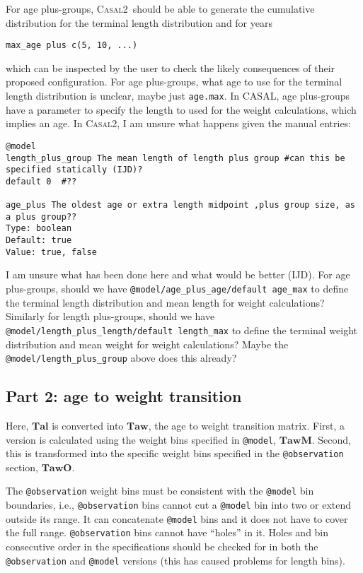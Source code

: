 \documentclass[a4paper,11pt,twoside,pdftex,draft]{article}
\newcommand{\CNAME}{\textsc{Casal2}}
\begin{document}
For age plus-groups, \CNAME\  should be able to generate the cumulative distribution for the terminal length distribution and for years \begin{verbatim} 
max_age plus c(5, 10, ...)
\end{verbatim}
 which can be inspected by the user to check the likely consequences of their proposed configuration. For age plus-groups, what age to use for the terminal length distribution is unclear, maybe just \texttt{age.max}. 
In CASAL, age plus-groups have a parameter to specify the length to used for the weight calculations, which implies an age. In \CNAME, I am unsure what happens given the manual entries:

\begin{verbatim}
@model
length_plus_group The mean length of length plus group #can this be specified statically (IJD)?
default 0  #??

age_plus The oldest age or extra length midpoint ,plus group size, as a plus group??
Type: boolean
Default: true
Value: true, false
\end{verbatim}

I am unsure what has been done here and what would be better (IJD).
For age plus-groups, should we have \texttt{@model/age\_plus\_age/default age\_max} to define the terminal length distribution and mean length for weight calculations?
Similarly for length plus-groups, should we have \texttt{@model/length\_plus\_length/default length\_max} to define the terminal weight distribution and mean weight for weight calculations? Maybe the \texttt{@model/length\_plus\_group} above does this already?

\subsection{Part 2: age to weight transition}
Here, $\mathbf{Tal}$ is converted into $\mathbf{Taw}$, the age to weight transition matrix. First, a version is calculated using the weight bins specified in \texttt{@model}, $\mathbf{TawM}$. Second, this is transformed into the specific weight bins specified in the \texttt{@observation} section, $\mathbf{TawO}$. 

The   \texttt{@observation}  weight bins must be consistent with the  \texttt{@model} bin boundaries, i.e.,  \texttt{@observation} bins cannot cut a 
\texttt{@model} bin into two or extend outside its range. It can concatenate \texttt{@model} bins and it does not have to cover the full range. \texttt{@observation} bins cannot have ``holes'' in it. 
Holes and bin consecutive order in the specifications should be checked for in both the \texttt{@observation} and \texttt{@model} versions (this has caused problems for length bins).
\end{document}
